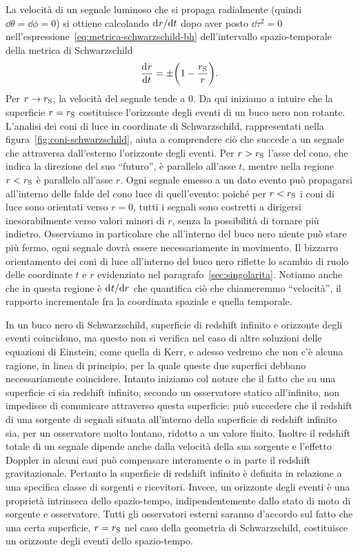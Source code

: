La velocità di un segnale luminoso che si propaga radialmente (quindi
\(\dd\theta = \dd\phi = 0\)) si ottiene calcolando \(\mathrm{d}^{}r / \mathrm{d} {t}^{}\) dopo aver
posto \(\dd\tau^{2} = 0\) nell'espressione~\eqref{eq:metrica-schwarzschild-bh}
dell'intervallo spazio-temporale della metrica di Schwarzschild
\begin{equation}
  \frac{{\mathop{}\!\mathrm{d}^{}}r}{\mathop{}\!\mathrm{d} {t}^{}} = \pm \biggl(1 - \frac{r_{\textup{S}}}{r}\biggr).
\end{equation}
Per \(r \to r_{\textup{S}}\), la velocità del segnale tende a \(0\).  Da qui
iniziamo a intuire che la superficie \(r = r_{\textup{S}}\) costituisce
l'orizzonte degli eventi di un buco nero non rotante.  L'analisi dei coni di
luce in coordinate di Schwarzschild, rappresentati nella
figura~\ref{fig:coni-schwarzschild}, aiuta a comprendere ciò che succede a un
segnale che attraversa dall'esterno l'orizzonte degli eventi.  Per \(r >
r_{\textup{S}}\) l'asse del cono, che indica la direzione del suo ``futuro'', è
parallelo all'asse \(t\), mentre nella regione \(r < r_{\textup{S}}\) è
parallelo all'asse \(r\).  Ogni segnale emesso a un dato evento può propagarsi
all'interno delle falde del cono luce di quell'evento: poiché per \(r <
r_{\textup{S}}\) i coni di luce sono orientati verso \(r = 0\), tutti i segnali
sono costretti a dirigersi inesorabilmente verso valori minori di \(r\), senza
la possibilità di tornare più indietro.  Osserviamo in particolare che
all'interno del buco nero niente può stare più fermo, ogni segnale dovrà essere
necessariamente in movimento.  Il bizzarro orientamento dei coni di luce
all'interno del buco nero riflette lo scambio di ruolo delle coordinate \(t\) e
\(r\) evidenziato nel paragrafo~\ref{sec:singolarita}.  Notiamo anche che in
questa regione è \(\mathrm{d}^{}t / \mathrm{d} {r}^{}\) che quantifica ciò che chiameremmo
``velocità'', il rapporto incrementale fra la coordinata spaziale e quella
temporale.

In un buco nero di Schwarzschild, superficie di redshift infinito e orizzonte
degli eventi coincidono, ma questo non si verifica nel caso di altre soluzioni
delle equazioni di Einstein, come quella di Kerr, e adesso vedremo che non c'è
alcuna ragione, in linea di principio, per la quale queste due superfici debbano
necessariamente coincidere.  Intanto iniziamo col notare che il fatto che su una
superficie ci sia redshift infinito, secondo un osservatore statico
all'infinito, non impedisce di comunicare attraverso questa superficie: può
succedere che il redshift di una sorgente di segnali situata all'interno della
superficie di redshift infinito sia, per un osservatore molto lontano, ridotto a
un valore finito.  Inoltre il redshift totale di un segnale dipende anche dalla
velocità della sua sorgente e l'effetto Doppler in alcuni casi può compensare
interamente o in parte il redshift gravitazionale.  Pertanto la superficie di
redshift infinito è definita in relazione a una specifica classe di sorgenti e
ricevitori.  Invece, un orizzonte degli eventi è una proprietà intrinseca dello
spazio-tempo, indipendentemente dallo stato di moto di sorgente e osservatore.
Tutti gli osservatori esterni saranno d'accordo sul fatto che una certa
superficie, \(r = r_{\textup{S}}\) nel caso della geometria di Schwarzschild,
costituisce un orizzonte degli eventi dello spazio-tempo.

